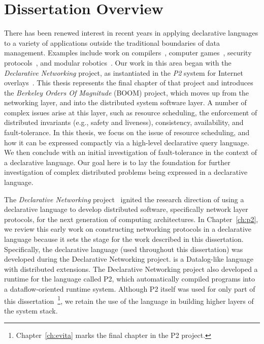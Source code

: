 \chapter[Dissertation Overview]{Dissertation Overview}
\label{ch:overview}

There has been renewed interest in recent years in applying declarative languages to a variety of 
applications outside the traditional boundaries of data management. Examples include work on 
compilers~\cite{lam05context}, computer games~\cite{white-sigmod07}, security protocols~\cite{li-padl03}, 
and modular robotics~\cite{ashley-iros07}. Our work in this area began with the {\em Declarative Networking} project,
as instantiated in the {\em P2} system for Internet overlays~\cite{p2:sosp, loo-sigmod06}. This thesis represents
the final chapter of that project and introduces the {\em Berkeley Orders Of Magnitude} (BOOM) 
project, which moves up from the networking layer, and into the distributed system software layer.  A number of complex issues 
arise at this layer, such as resource scheduling, the enforcement of distributed invariants (e.g., safety and liveness), 
consistency, availability, and fault-tolerance. In this thesis, we focus on the issue of resource scheduling, and how it
can be expressed compactly via a high-level declarative query language. We then conclude with an initial investigation of 
fault-tolerance in the context of a declarative language. Our goal here is to lay the foundation for further investigation
of complex distributed problems being expressed in a declarative language.

The {\em Declarative Networking} project~\cite{boon-thesis} ignited the research direction of using a declarative language to develop
distributed software, specifically network layer protocols, for the next generation of computing architectures. 
In Chapter~\ref{ch:p2}, we review this early work on constructing networking protocols in a declarative language because it sets 
the stage for the work described in this dissertation. Specifically, the declarative language \OVERLOG (used throughout 
this dissertation) was developed during the Declarative Networking project. \OVERLOG is a Datalog-like language with distributed 
extensions. The Declarative Networking project also developed a runtime for the \OVERLOG language called P2, 
which automatically compiled \OVERLOG programs into a dataflow-oriented runtime system. Although P2 itself was used for only 
part of this dissertation~\footnote{Chapter~\ref{ch:evita} marks the final chapter in the P2 project.}, we retain the use of 
the \OVERLOG language in building higher layers of the system stack.

